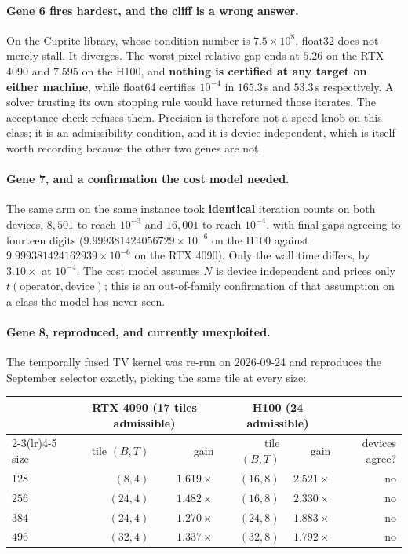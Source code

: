 \documentclass[11pt]{article}
\begin{document}
\paragraph{Gene 6 fires hardest, and the cliff is a wrong answer.}
On the Cuprite library, whose condition number is $7.5\times10^8$, float32
does not merely stall. It diverges. The worst-pixel relative gap ends at
$5.26$ on the RTX 4090 and $7.595$ on the H100, and \textbf{nothing is
certified at any target on either machine}, while float64 certifies $10^{-4}$
in $165.3$\,s and $53.3$\,s respectively. A solver trusting its own stopping
rule would have returned those iterates. The acceptance check refuses them.
Precision is therefore not a speed knob on this class; it is an admissibility
condition, and it is device independent, which is itself worth recording
because the other two genes are not.

\paragraph{Gene 7, and a confirmation the cost model needed.}
The same arm on the same instance took \textbf{identical} iteration counts on
both devices, $8{,}501$ to reach $10^{-3}$ and $16{,}001$ to reach $10^{-4}$,
with final gaps agreeing to fourteen digits
($9.999381424056729\times10^{-6}$ on the H100 against
$9.999381424162939\times10^{-6}$ on the RTX 4090). Only the wall time differs,
by $3.10\times$ at $10^{-4}$. The cost model assumes $N$ is device independent
and prices only $t(\text{operator},\text{device})$; this is an out-of-family
confirmation of that assumption on a class the model has never seen.

\paragraph{Gene 8, reproduced, and currently unexploited.}
The temporally fused TV kernel was re-run on 2026-09-24 and reproduces the
September selector exactly, picking the same tile at every size:

\begin{center}\small
\begin{tabular}{@{}lrrrrr@{}}
\toprule
 & \multicolumn{2}{c}{RTX 4090 (17 tiles admissible)} &
   \multicolumn{2}{c}{H100 (24 admissible)} & \\
\cmidrule(lr){2-3}\cmidrule(lr){4-5}
size & tile $(B,T)$ & gain & tile $(B,T)$ & gain & devices agree? \\
\midrule
$128$ & $(8,4)$  & $1.619\times$ & $(16,8)$ & $2.521\times$ & no \\
$256$ & $(24,4)$ & $1.482\times$ & $(16,8)$ & $2.330\times$ & no \\
$384$ & $(24,4)$ & $1.270\times$ & $(24,8)$ & $1.883\times$ & no \\
$496$ & $(32,4)$ & $1.337\times$ & $(32,8)$ & $1.792\times$ & no \\
\bottomrule
\end{tabular}
\end{center}
\end{document}
